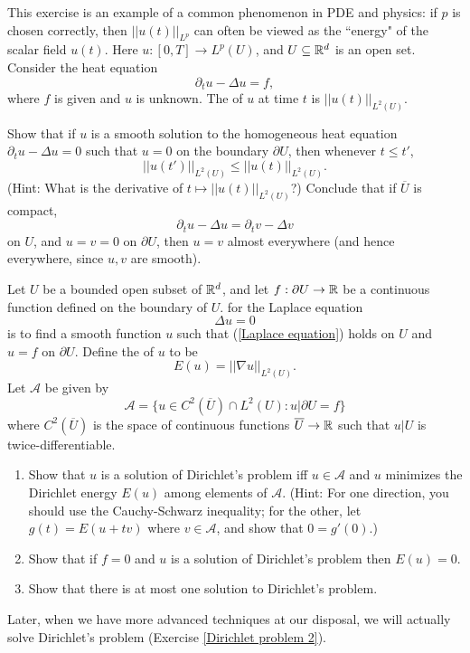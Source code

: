 \begin{exercise}
This exercise is an example of a common phenomenon in PDE and physics: if $p$ is chosen correctly, then $||u(t)||_{L^p}$ can often be viewed as the ``energy" of the scalar field $u(t)$. Here $u: [0, T] \to L^p(U)$, and $U \subseteq \mathbb{R}^d$ is an open set.
Consider the heat equation
$$\partial_t u - \Delta u = f,$$
where $f$ is given and $u$ is unknown. The  of $u$ at time $t$ is $||u(t)||_{L^2(U)}$.

Show that if $u$ is a smooth solution to the homogeneous heat equation $\partial_t u - \Delta u = 0$ such that $u = 0$ on the boundary $\partial U$, then whenever $t \leq t'$,
$$||u(t')||_{L^2(U)} \leq ||u(t)||_{L^2(U)}.$$
(Hint: What is the derivative of $t \mapsto ||u(t)||_{L^2(U)}$?)
Conclude that if $\overline U$ is compact,
$$\partial_t u - \Delta u = \partial_t v - \Delta v$$
on $U$, and $u = v = 0$ on $\partial U$, then $u = v$ almost everywhere (and hence everywhere, since $u,v$ are smooth).
\end{exercise}

\begin{exercise}
\label{Dirichlet problem}
Let $U$ be a bounded open subset of $\mathbb{R}^d$, and let $f: \partial U \to \mathbb{R}$ be a continuous function defined on the boundary of $U$.
 for the Laplace equation
\begin{equation}
\label{Laplace equation}
\Delta u = 0
\end{equation}
is to find a smooth function $u$ such that (\ref{Laplace equation}) holds on $U$ and $u = f$ on $\partial U$.
Define the  of $u$ to be
$$E(u) = ||\nabla u||_{L^2(U)}.$$
Let $\mathcal A$ be given by
$$\mathcal A = \{u \in C^2(\overline U) \cap L^2(U): u|\partial U = f\}$$
where $C^2(\overline U)$ is the space of continuous functions $\overline U \to \mathbb{R}$ such that $u|U$ is twice-differentiable.
\begin{enumerate}
\item Show that $u$ is a solution of Dirichlet's problem iff $u \in \mathcal A$ and $u$ minimizes the Dirichlet energy $E(u)$ among elements of $\mathcal A$.
(Hint: For one direction, you should use the Cauchy-Schwarz inequality; for the other, let $g(t) = E(u + tv)$ where $v \in \mathcal A$, and show that $0 = g'(0)$.)
\item Show that if $f = 0$ and $u$ is a solution of Dirichlet's problem then $E(u) = 0$.
\item Show that there is at most one solution to Dirichlet's problem.
\end{enumerate}
Later, when we have more advanced techniques at our disposal, we will actually solve Dirichlet's problem (Exercise \ref{Dirichlet problem 2}).
\end{exercise}

